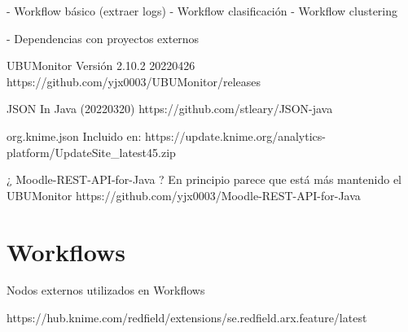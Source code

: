 - Workflow básico (extraer logs)
- Workflow clasificación
- Workflow clustering





- Dependencias con proyectos externos

UBUMonitor
Versión 2.10.2 20220426
https://github.com/yjx0003/UBUMonitor/releases


JSON In Java (20220320)
https://github.com/stleary/JSON-java


org.knime.json 
Incluido en: 
https://update.knime.org/analytics-platform/UpdateSite_latest45.zip


¿ Moodle-REST-API-for-Java ? En principio parece que está más mantenido el UBUMonitor
https://github.com/yjx0003/Moodle-REST-API-for-Java







\section{Workflows}

Nodos externos utilizados en Workflows


https://hub.knime.com/redfield/extensions/se.redfield.arx.feature/latest